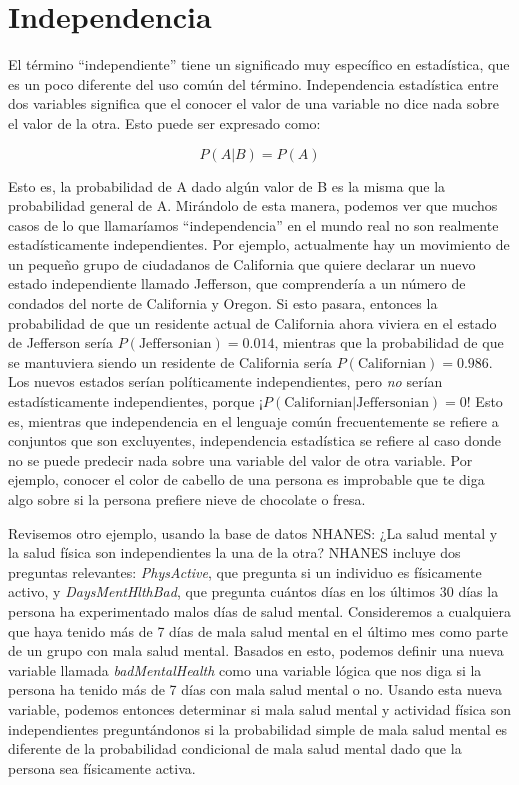 \documentclass[
  12pt,
]{book}
\begin{document}
\hypertarget{independencia}{%
\section{Independencia}\label{independencia}}

El término ``independiente'' tiene un significado muy específico en estadística, que es un poco diferente del uso común del término. Independencia estadística entre dos variables significa que el conocer el valor de una variable no dice nada sobre el valor de la otra. Esto puede ser expresado como:

\[
P(A|B) = P(A)
\]

Esto es, la probabilidad de A dado algún valor de B es la misma que la probabilidad general de A. Mirándolo de esta manera, podemos ver que muchos casos de lo que llamaríamos ``independencia'' en el mundo real no son realmente estadísticamente independientes. Por ejemplo, actualmente hay un movimiento de un pequeño grupo de ciudadanos de California que quiere declarar un nuevo estado independiente llamado Jefferson, que comprendería a un número de condados del norte de California y Oregon. Si esto pasara, entonces la probabilidad de que un residente actual de California ahora viviera en el estado de Jefferson sería \(P(\text{Jeffersonian})=0.014\), mientras que la probabilidad de que se mantuviera siendo un residente de California sería \(P(\text{Californian})=0.986\). Los nuevos estados serían políticamente independientes, pero \emph{no} serían estadísticamente independientes, porque ¡\(P(\text{Californian|Jeffersonian}) = 0\)! Esto es, mientras que independencia en el lenguaje común frecuentemente se refiere a conjuntos que son excluyentes, independencia estadística se refiere al caso donde no se puede predecir nada sobre una variable del valor de otra variable. Por ejemplo, conocer el color de cabello de una persona es improbable que te diga algo sobre si la persona prefiere nieve de chocolate o fresa.

Revisemos otro ejemplo, usando la base de datos NHANES: ¿La salud mental y la salud física son independientes la una de la otra? NHANES incluye dos preguntas relevantes: \emph{PhysActive}, que pregunta si un individuo es físicamente activo, y \emph{DaysMentHlthBad}, que pregunta cuántos días en los últimos 30 días la persona ha experimentado malos días de salud mental. Consideremos a cualquiera que haya tenido más de 7 días de mala salud mental en el último mes como parte de un grupo con mala salud mental. Basados en esto, podemos definir una nueva variable llamada \emph{badMentalHealth} como una variable lógica que nos diga si la persona ha tenido más de 7 días con mala salud mental o no. Usando esta nueva variable, podemos entonces determinar si mala salud mental y actividad física son independientes preguntándonos si la probabilidad simple de mala salud mental es diferente de la probabilidad condicional de mala salud mental dado que la persona sea físicamente activa.
\end{document}
